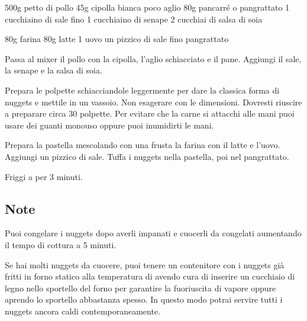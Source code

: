 \begin{ingreds}
	500g  petto di pollo 
	45g cipolla bianca 
	poco aglio
	80g pancarré o pangrattato 
	1 cucchiaino di sale fino
	1 cucchiaino di senape 
	2 cucchiai di salsa di soia

\columnbreak
{}
	80g farina 
	80g latte 
	1 uovo 
	un pizzico di sale fino
	pangrattato 
\end{ingreds}

\begin{method}
Passa al mixer il pollo con la cipolla, l'aglio schiacciato e il pane. Aggiungi il sale, la senape e la salsa di soia.

Prepara le polpette schiacciandole leggermente per dare la classica forma di nuggets e mettile in un vassoio. Non esagerare con le dimensioni. Dovresti riuscire a preparare circa 30 polpette. Per evitare che la carne si attacchi alle mani puoi usare dei guanti monouso oppure puoi inumidirti le mani.

Prepara la pastella mescolando con una frusta la farina con il latte e l'uovo. Aggiungi un pizzico di sale. Tuffa i nuggets nella pastella, poi nel pangrattato.

Friggi a  per 3 minuti.

\end {method}

\subsection*{Note}
		Puoi congelare i nuggets dopo averli impanati e cuocerli da congelati aumentando il tempo di cottura a 5 minuti.

		Se hai molti nuggets da cuocere, puoi tenere un contenitore con i nuggets già fritti in forno statico alla temperatura di  avendo cura di inserire un cucchiaio di legno nello sportello del forno per garantire la fuoriuscita di vapore oppure aprendo lo sportello abbastanza spesso. In questo modo potrai servire tutti i nuggets ancora caldi contemporaneamente.



